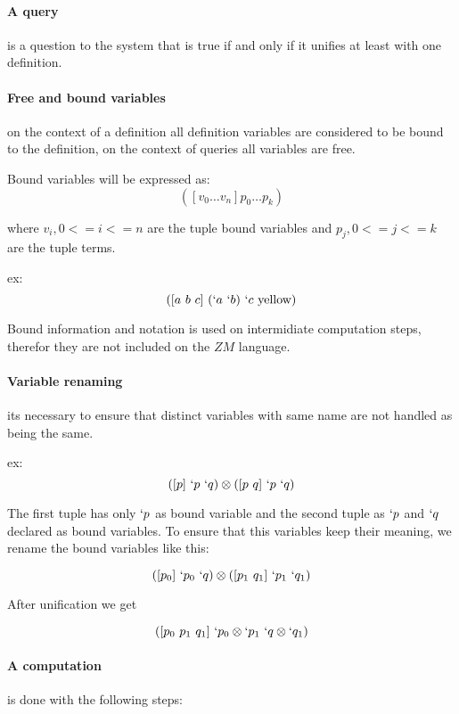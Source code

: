 \documentclass[11pt,a4paper]{report}
\newcommand{\zm}{ZM}
\newcommand{\var}[1]{`#1}
\newcommand{\unify}{\otimes}
\begin{document}
\paragraph{A query} is a question to the system that is true if and only if it unifies at least with
one definition.

\paragraph{Free and bound variables} on the context of a definition all definition variables are considered
to be bound to the definition, on the context of queries all variables are free.

Bound variables will be expressed as:
\[
    ([v_{0} \ldots v_{n}] p_{0} \ldots p_{k})
\]

where $v_{i}, 0 <= i <= n$ are the tuple bound variables and $p_{j}, 0 <= j <=k$ are the tuple terms.

ex:
\[
    ([a\ b\ c]\ (\var{a}\ \var{b})\ \var{c}\ \text{yellow})
\]

Bound information and notation is used on intermidiate computation steps, therefor they are not included on the $\zm$ language.


\paragraph{Variable renaming} its necessary to ensure that distinct variables with same name are not handled as being the same.

ex:
\[
    ([p]\ \var{p}\ \var{q}) \unify ([p\ q]\ \var{p}\ \var{q})
\]

The first tuple has only $\var{p}$ as bound variable and the second tuple as $\var{p}$ and $\var{q}$ declared as bound variables.
To ensure that this variables keep their meaning, we rename the bound variables like this:

\[
    ([p_{0}]\ \var{p_{0}}\ \var{q}) \unify ([p_{1}\ q_{1}]\ \var{p_{1}}\ \var{q_{1}})
\]

After unification we get

\[
    ([p_{0}\ p_{1}\ q_{1}]\ \var{p_{0}} \unify \var{p_{1}}\ \var{q} \unify \var{q_{1}})
\]


\paragraph{A computation} is done with the following steps:
\end{document}
